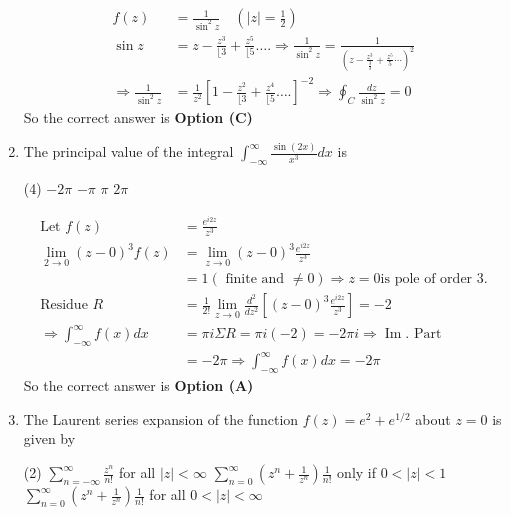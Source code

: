 \begin{enumerate}[label=\color{ocre}\textbf{\arabic*.}]
\begin{answer}
\begin{align*}
		f(z)&=\frac{1}{\sin ^{2} z} \quad\left(|z|=\frac{1}{2}\right)\\
		\sin z&=z-\frac{z^{3}}{\lfloor 3}+\frac{z^{5}}{\lfloor 5} \ldots . \Rightarrow \frac{1}{\sin ^{2} z}=\frac{1}{\left(z-\frac{z^{3}}{\frac{3}{3}}+\frac{z^{5}}{5} \cdots\right)^{2}}\\
		\Rightarrow \frac{1}{\sin ^{2} z}&=\frac{1}{z^{2}}\left[1-\frac{z^{2}}{\lfloor 3}+\frac{z^{4}}{\lfloor 5} \ldots .\right]^{-2} \Rightarrow \oint_{C} \frac{d z}{\sin ^{2} z}=0
		\end{align*}
		So the correct answer is \textbf{Option (C)}
	\end{answer}
	\item The principal value of the integral $\int_{-\infty}^{\infty} \frac{\sin (2 x)}{x^{3}} d x$ is
	{}
	\begin{tasks}(4)
		\task[\textbf{A.}] $-2 \pi$
		\task[\textbf{B.}]  $-\pi$
		\task[\textbf{C.}] $\pi$
		\task[\textbf{D.}]  $2 \pi$
	\end{tasks}
	\begin{answer}
		\begin{align*}
		\text{Let }f(z)&=\frac{e^{i 2 z}}{z^{3}}\\
		\lim _{2 \rightarrow 0}(z-0)^{3} f(z)&=\lim _{z \rightarrow 0}(z-0)^{3} \frac{e^{i 2 z}}{z^{3}}\\&=1(\text{ finite and }\neq 0) \Rightarrow z=0 \text{is pole of order 3} .\\
		\text{Residue }R&=\frac{1}{2 !} \lim _{z \rightarrow 0} \frac{d^{2}}{d z^{2}}\left[(z-0)^{3} \frac{e^{i 2 z}}{z^{3}}\right]=-2\\
		\Rightarrow \int_{-\infty}^{\infty} f(x) d x&=\pi i \Sigma R=\pi i(-2)=-2 \pi i \Rightarrow \operatorname{Im} .\text{ Part }\\&=-2 \pi \Rightarrow \int_{-\infty}^{\infty} f(x) d x=-2 \pi
		\end{align*}
		So the correct answer is \textbf{Option (A)}
	\end{answer}
	\item The Laurent series expansion of the function $f(z)=e^{2}+e^{1 / 2}$ about $z=0$ is given by
	{}
	\begin{tasks}(2)
		\task[\textbf{A.}] $\sum_{n=-\infty}^{\infty} \frac{z^{n}}{n !}$ for all $|z|<\infty$
		\task[\textbf{B.}] $\sum_{n=0}^{\infty}\left(z^{n}+\frac{1}{z^{n}}\right) \frac{1}{n !}$ only if $0<|z|<1$
		\task[\textbf{C.}] $\sum_{n=0}^{\infty}\left(z^{n}+\frac{1}{z^{n}}\right) \frac{1}{n !}$ for all $0<|z|<\infty$

\end{tasks}
\end{enumerate}

